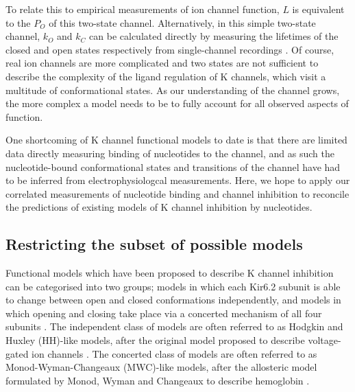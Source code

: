 To relate this to empirical measurements of ion channel function, $L$ is equivalent to the $P_O$ of this two-state channel.
Alternatively, in this simple two-state channel, $k_O$ and $k_C$ can be calculated directly by measuring the lifetimes of the closed and open states respectively from single-channel recordings \cite{reinhold_penner_auth_single-channel_1995, sivilotti_praise_2016}.
Of course, real ion channels are more complicated and two states are not sufficient to describe the complexity of the ligand regulation of K\ATP{} channels, which visit a multitude of conformational states.
As our understanding of the channel grows, the more complex a model needs to be to fully account for all observed aspects of function.

One shortcoming of K\ATP{} channel functional models to date is that there are limited data directly measuring binding of nucleotides to the channel, and as such the nucleotide-bound conformational states and transitions of the channel have had to be inferred from electrophysiologcal measurements.
Here, we hope to apply our correlated measurements of nucleotide binding and channel inhibition to reconcile the predictions of existing models of K\ATP{} channel inhibition by nucleotides.

\subsection{Restricting the subset of possible models}

Functional models which have been proposed to describe K\ATP{} channel inhibition can be categorised into two groups; models in which each Kir6.2 subunit is able to change between open and closed conformations independently, and models in which opening and closing take place via a concerted mechanism of all four subunits \cite{enkvetchakul_kinetic_2000-1, enkvetchakul_atp_2001, drain_concerted_2004, fang_n-terminal_2006, wang_subunit-stoichiometric_2007, craig_how_2008-1, proks_modeling_2009, vedovato_nucleotide-binding_2015}.
The independent class of models are often referred to as Hodgkin and Huxley (HH)-like models, after the original model proposed to describe voltage-gated ion channels \cite{hodgkin_quantitative_1952}.
The concerted class of models are often referred to as Monod-Wyman-Changeaux (MWC)-like models, after the allosteric model formulated by Monod, Wyman and Changeaux to describe hemoglobin \cite{monod_nature_1965}.

